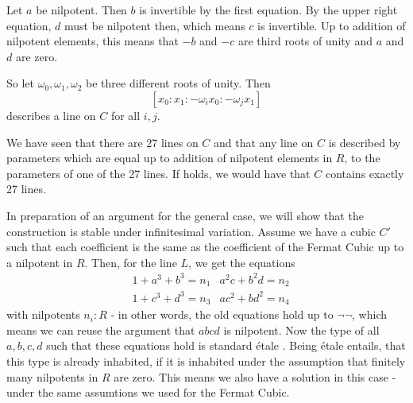 Let $a$ be nilpotent. Then $b$ is invertible by the first equation.
By the upper right equation, $d$ must be nilpotent then, which means $c$ is invertible.
Up to addition of nilpotent elements,
this means that $-b$ and $-c$ are third roots of unity and $a$ and $d$ are zero.

So let $\omega_0,\omega_1,\omega_2$ be three different roots of unity.
Then
\[
   [x_0:x_1:-\omega_ix_0:-\omega_jx_1]
\]
describes a line on $C$ for all $i,j$.

We have seen that there are 27 lines on $C$ and that any line on $C$ is described by parameters which are equal up to addition of nilpotent elements in $R$, to the parameters of one of the 27 lines.
If  holds, we would have that $C$ contains exactly 27 lines. 

In preparation of an argument for the general case,
we will show that the construction is stable under infinitesimal variation.
Assume we have a cubic $C'$ such that each coefficient is the same as the coefficient of the Fermat Cubic up to a nilpotent in $R$. Then, for the line $L$, we get the equations
\begin{align*}
  &1+a^3+b^3=n_1 &a^2c+b^2d=n_2 \\
  &1+c^3+d^3=n_3 &ac^2+bd^2=n_4
\end{align*}
with nilpotents $n_i:R$ - in other words, the old equations hold up to $\neg\neg$,
which means we can reuse the argument that $abcd$ is nilpotent.
Now the type of all $a,b,c,d$ such that these equations hold is standard étale \cite[Definition 4.3.2]{diffgeo-article}.
Being étale entails, that this type is already inhabited,
if it is inhabited under the assumption that finitely many nilpotents in $R$ are zero.
This means we also have a solution in this case
- under the same assumtions we used for the Fermat Cubic.
